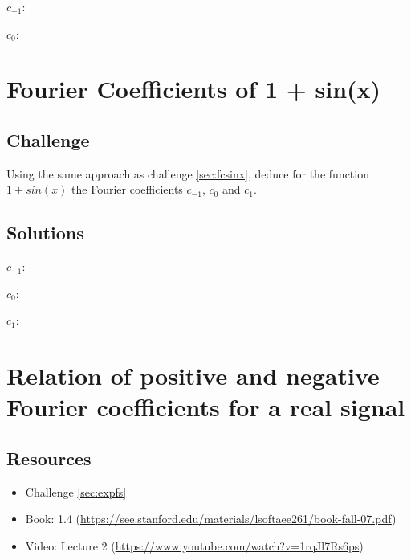 $c_{-1}$:\\

$c_0$:\\




\newpage

\section{Fourier Coefficients of 1 + sin(x)}
\label{sec:fcsinxp1}

\subsection*{Challenge}
Using the same approach as challenge \ref{sec:fcsinx}, deduce for the function $1+sin(x)$ the Fourier coefficients $c_{-1}$, $c_0$ and $c_1$.

\subsection*{Solutions}
$c_{-1}$:\\

$c_0$:\\

$c_1$:\\





\newpage

\section{Relation of positive and negative Fourier coefficients for a real signal}

\subsection*{Resources}
\begin{itemize}
    \item Challenge \ref{sec:expfs}
    \item Book: 1.4 (\url{https://see.stanford.edu/materials/lsoftaee261/book-fall-07.pdf})
    \item Video: Lecture 2 (\url{https://www.youtube.com/watch?v=1rqJl7Rs6ps})
\end{itemize}

